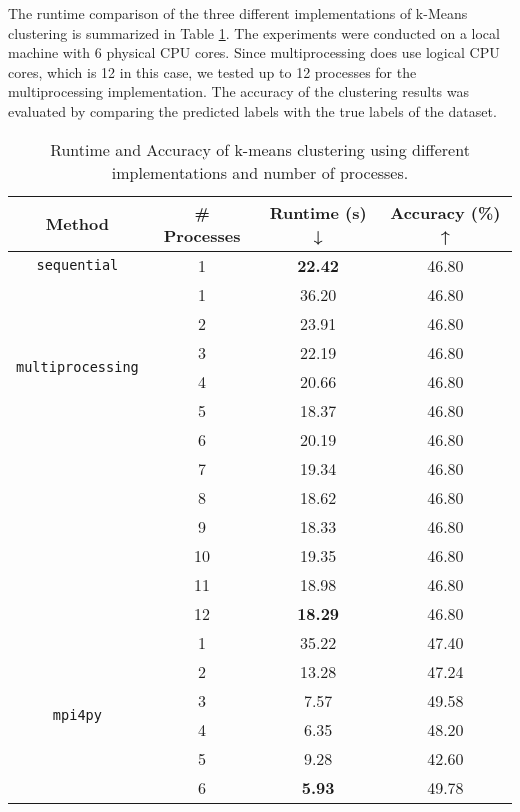 \documentclass[12pt,letterpaper, onecolumn]{exam}
\begin{document}
\begin{questions}
\begin{parts}
\begin{solution}
            The runtime comparison of the three different implementations of k-Means clustering is summarized in Table \ref{tab:runtime_accuracy_kmeans}.
            The experiments were conducted on a local machine with 6 physical CPU cores. Since multiprocessing does use logical CPU cores, which is 12
            in this case, we tested up to 12 processes for the multiprocessing implementation.
            The accuracy of the clustering results was evaluated by comparing the predicted labels with the true labels of the dataset.

            \begin{table}[H]
                \centering
                \begin{tabular}{|c|c|c|c|}
                    \hline
                    \textbf{Method} & \textbf{\# Processes} & \textbf{Runtime (s) ↓} & \textbf{Accuracy (\%) ↑} \\
                    \hline
                    \multirow{1}{*}{\texttt{sequential}} 
                        & 1  & \textbf{22.42} & 46.80 \\
                    \hline
                    \multirow{6}{*}{\texttt{multiprocessing}}
                        & 1  & 36.20 & 46.80 \\
                        & 2  & 23.91 & 46.80 \\
                        & 3  & 22.19 & 46.80 \\
                        & 4  & 20.66 & 46.80 \\
                        & 5  & 18.37 & 46.80 \\
                        & 6  & 20.19 & 46.80 \\
                        & 7  & 19.34 & 46.80 \\
                        & 8  & 18.62 & 46.80 \\
                        & 9  & 18.33 & 46.80 \\
                        & 10 & 19.35 & 46.80 \\
                        & 11 & 18.98 & 46.80 \\
                        & 12 & \textbf{18.29} & 46.80 \\
                    \hline
                    \multirow{6}{*}{\texttt{mpi4py}} 
                        & 1 & 35.22 & 47.40 \\
                        & 2 & 13.28 & 47.24 \\
                        & 3 & 7.57  & 49.58 \\
                        & 4 & 6.35  & 48.20 \\
                        & 5 & 9.28  & 42.60 \\
                        & 6 & \textbf{5.93} & 49.78 \\
                    \hline
                \end{tabular}
                \caption{Runtime and Accuracy of k-means clustering using different implementations and number of processes.}
                \label{tab:runtime_accuracy_kmeans}
            \end{table}


\end{solution}
\end{parts}
\end{questions}
\end{document}
